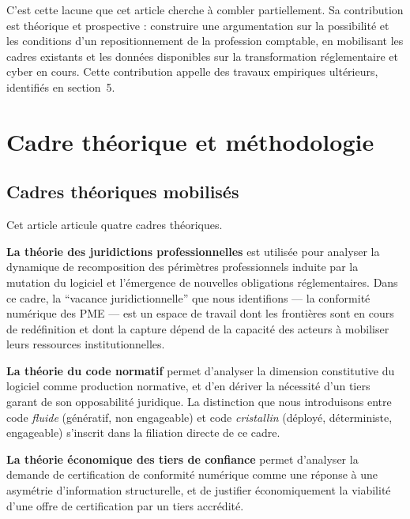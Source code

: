 \documentclass[12pt,a4paper]{article}
\begin{document}
C'est cette lacune que cet article cherche à combler partiellement. Sa contribution est théorique et prospective : construire une argumentation sur la possibilité et les conditions d'un repositionnement de la profession comptable, en mobilisant les cadres existants et les données disponibles sur la transformation réglementaire et cyber en cours. Cette contribution appelle des travaux empiriques ultérieurs, identifiés en section~5.

\section{Cadre théorique et méthodologie}

\subsection{Cadres théoriques mobilisés}

Cet article articule quatre cadres théoriques.

\textbf{La théorie des juridictions professionnelles} \parencite{abbott1988} est utilisée pour analyser la dynamique de recomposition des périmètres professionnels induite par la mutation du logiciel et l'émergence de nouvelles obligations réglementaires. Dans ce cadre, la \enquote{vacance juridictionnelle} que nous identifions — la conformité numérique des PME — est un espace de travail dont les frontières sont en cours de redéfinition et dont la capture dépend de la capacité des acteurs à mobiliser leurs ressources institutionnelles.

\textbf{La théorie du code normatif} \parencite{lessig1999, zittrain2008} permet d'analyser la dimension constitutive du logiciel comme production normative, et d'en dériver la nécessité d'un tiers garant de son opposabilité juridique. La distinction que nous introduisons entre code \emph{fluide} (génératif, non engageable) et code \emph{cristallin} (déployé, déterministe, engageable) s'inscrit dans la filiation directe de ce cadre.

\textbf{La théorie économique des tiers de confiance} \parencite{akerlof1970, williamson1985, north1990} permet d'analyser la demande de certification de conformité numérique comme une réponse à une asymétrie d'information structurelle, et de justifier économiquement la viabilité d'une offre de certification par un tiers accrédité.
\end{document}
